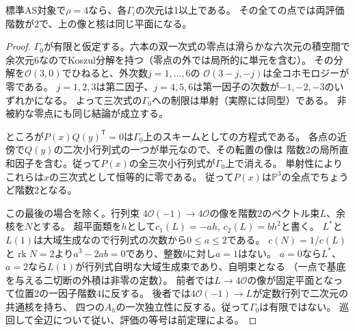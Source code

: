 \begin{theorem}\label{thm:rho-four-positive-incidence}
標準AS対象で$\rho=4$なら、各$\Gamma_i$の次元は1以上である。
その全ての点では両評価階数が2で、上の像と核は同じ平面になる。
\end{theorem}
\begin{proof}
$\Gamma_0$が有限と仮定する。六本の双一次式の零点は滑らかな六次元の積空間で
余次元6なのでKoszul分解を持つ（零点の外では局所的に単元を含む）。
その分解を$\mathcal O(3,0)$でひねると、外次数$j=1,\ldots,6$の
$\mathcal O(3-j,-j)$は全コホモロジーが零である。
$j=1,2,3$は第二因子、$j=4,5,6$は第一因子の次数が$-1,-2,-3$のいずれかになる。
よって三次式の$\Gamma_0$への制限は単射（実際には同型）である。
非被約な零点にも同じ結論が成立する。

ところが$P(x)Q(y)^{\mathsf T}=0$は$\Gamma_0$上のスキームとしての方程式である。
各点の近傍で$Q(y)$の二次小行列式の一つが単元なので、その転置の像は
階数2の局所直和因子を含む。従って$P(x)$の全三次小行列式が$\Gamma_0$上で消える。
単射性によりこれらは$x$の三次式として恒等的に零である。
従って$P(x)$は$\mathbb P^3$の全点でちょうど階数2となる。

この最後の場合を除く。行列束
$4\mathcal O(-1)\to4\mathcal O$の像を階数2のベクトル束$L$、余核を$N$とする。
超平面類を$h$として$c_1(L)=-a h$, $c_2(L)=b h^2$と書く。
$L^*$と$L(1)$は大域生成なので行列式の次数から$0\le a\le2$である。
$c(N)=1/c(L)$と$\operatorname{rk}N=2$より$a^3-2ab=0$であり、整数$b$に対し$a=1$はない。
$a=0$なら$L^*$、$a=2$なら$L(1)$が行列式自明な大域生成束であり、自明束となる
（一点で基底を与える二切断の外積は非零の定数）。
前者では$L\to4\mathcal O$の像が固定平面となって位置2の一因子階数4に反する。
後者では$4\mathcal O(-1)\to L$が定数行列で二次元の共通核を持ち、
四つの$A_h$の一次独立性に反する。従って$\Gamma_0$は有限ではない。
巡回して全辺について従い、評価の等号は前定理による。
\end{proof}

